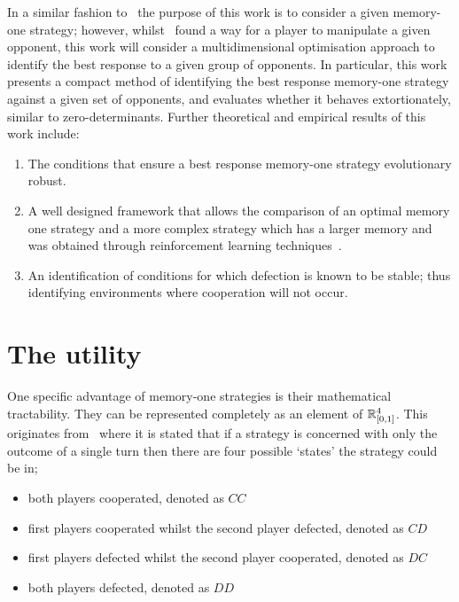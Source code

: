 In a similar fashion to~\cite{Press2012} the purpose of this work is to consider
a given memory-one strategy; however, whilst~\cite{Press2012} found a way for a
player to manipulate a given opponent, this work will consider a
multidimensional optimisation approach to identify the best response to a given
group of opponents. In particular, this work presents a compact method of
identifying the best response memory-one strategy against a given set of
opponents, and evaluates whether it behaves extortionately, similar to
zero-determinants. Further theoretical and empirical results of this work
include:

\begin{enumerate}
    \item The conditions that ensure a best response memory-one strategy evolutionary
    robust.
    \item A well designed framework that allows the comparison of an optimal
          memory one strategy and a more complex strategy which has a larger
          memory and was obtained through reinforcement learning
          techniques~\cite{Harper2017}.
    \item An identification of conditions for which defection is known to be
    stable; thus identifying environments where cooperation will not
    occur.
\end{enumerate}

\section{The utility}\label{section:utility}

One specific advantage of memory-one strategies is their mathematical
tractability. They can be represented completely as an element of \(\mathbb{R}^{4}_{[0, 1]}\). This
originates from~\cite{Nowak1989} where it is stated that if a strategy is
concerned with only the outcome of a single turn then there are four possible
`states' the strategy could be in;

\begin{itemize}
    \item both players cooperated, denoted as \(CC\)
    \item first players cooperated whilst the second player defected, denoted as \(CD\)
    \item first players defected whilst the second player cooperated, denoted as \(DC\)
    \item both players defected, denoted as \(DD\)
\end{itemize}

